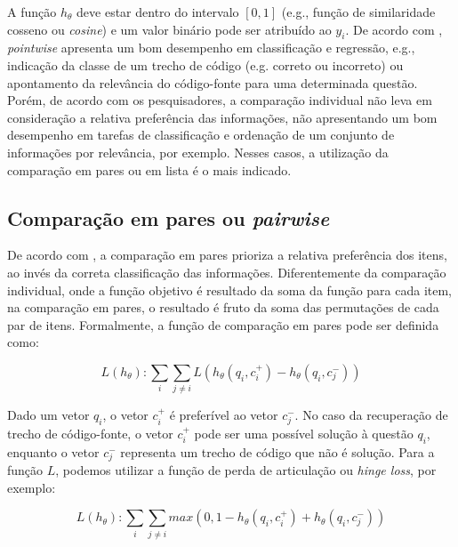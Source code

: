A função $h_{\theta}$ deve estar dentro do intervalo $[0, 1]$ (e.g., função de similaridade cosseno ou \textit{cosine}) e um valor binário pode ser atribuído ao $y_{i}$. De acordo com \cite{guo-deep-look-into-neural-ranking-models:2019, wu-sql-rank-listwise-approach:2018},  \textit{pointwise} apresenta um bom desempenho em classificação e regressão, e.g., indicação da classe de um trecho de código (e.g. correto ou incorreto) ou apontamento da relevância do código-fonte para uma determinada questão. Porém, de acordo com os pesquisadores, a comparação individual não leva em consideração a relativa preferência das informações, não apresentando um bom desempenho em tarefas de classificação e ordenação de um conjunto de informações por relevância, por exemplo. Nesses casos, a utilização da comparação em pares ou em lista é o mais indicado.


\subsection{Comparação em pares ou \textit{pairwise}}
\label{sec:secao-comparacao-em-pares-pairwise}

De acordo com \cite{guo-deep-look-into-neural-ranking-models:2019}, a comparação em pares prioriza a relativa preferência dos itens, ao invés da correta classificação das informações. Diferentemente da comparação individual, onde a função objetivo é resultado da soma da função para cada item, na comparação em pares, o resultado é fruto da soma das permutações de cada par de itens. Formalmente, a função de comparação em pares pode ser definida como:

\begin{equation}
    L (h_{\theta}): \sum_{i} \sum_{j \neq i} L( h_{\theta}(q_{i}, c_{i}^{+}) - h_{\theta}(q_{i}, c_{j}^{-})) 
\end{equation}

 Dado um vetor $q_{i}$, o vetor $c_{i}^{+}$ é preferível ao vetor $c_{j}^{-}$. No caso da recuperação de trecho de código-fonte, o vetor $c_{i}^{+}$ pode ser uma possível solução à questão $q_{i}$, enquanto o vetor $c_{j}^{-}$ representa um trecho de código que não é solução. Para a função $L$, podemos utilizar a função de perda de articulação ou \textit{hinge loss}, por exemplo:

\begin{equation}
    L (h_{\theta}): \sum_{i} \sum_{j \neq i} max(0, 1 - h_{\theta}(q_{i}, c_{i}^{+}) + h_{\theta}(q_{i}, c_{j}^{-})) 
\end{equation}

